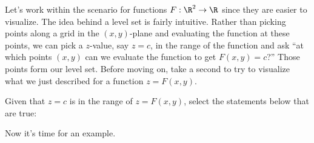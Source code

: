 \documentclass{ximera}
\begin{document}
Let's work within the scenario for functions $F:\R^2 \to \R$ since
they are easier to visualize.  The idea behind a level set is fairly
intuitive.  Rather than picking points along a grid in the
$(x,y)$-plane and evaluating the function at these points, we can pick
a $z$-value, say $z=c$, in the range of the function and ask ``at
which points $(x,y)$ can we evaluate the function to get $F(x,y)=c$?''
Those points form our level set.  Before moving on, take a second to
try to visualize what we just described for a function $z=F(x,y)$.
\begin{example}
  Given that $z=c$ is in the range of $z=F(x,y)$, select the
  statements below that are true:
  \begin{selectAll}
  \end{selectAll}
\end{example}

Now it's time for an example.
\end{document}
